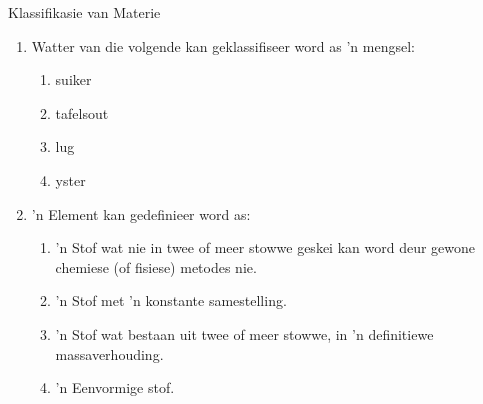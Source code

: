 \begin{eocexercises}{Klassifikasie van Materie}{
\nopagebreak
\begin{enumerate}[noitemsep, label=\textbf{\arabic*}. ] 
        \item Watter van die volgende kan geklassifiseer word as 'n mengsel:
        \begin{enumerate}[noitemsep, label=\textbf{\alph*}. ] 
            \item suiker
            \item tafelsout
            \item lug
            \item yster
        \end{enumerate}
        \item 'n Element kan gedefinieer word as:
        \begin{enumerate}[noitemsep, label=\textbf{\alph*}.] 
            \item 'n Stof wat nie in twee of meer stowwe geskei kan word deur gewone chemiese (of fisiese) metodes nie.
            \item 'n Stof met 'n konstante samestelling.
            \item 'n Stof wat bestaan uit twee of meer stowwe, in 'n definitiewe massaverhouding.
            \item 'n Eenvormige stof.
        \end{enumerate}


\end{enumerate}}
\end{eocexercises}
